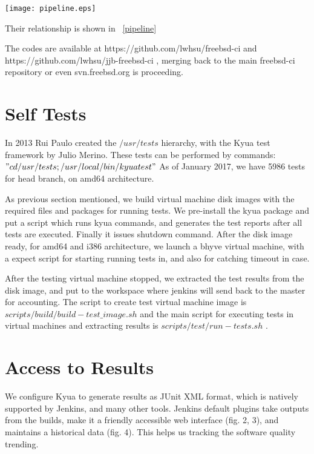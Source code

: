 \documentclass[a4paper,twocolumn,10pt]{article}
\begin{document}
\begin{figure*}
\texttt{[image: pipeline.eps]}
\caption{head-amd64 pipeline}
\label{pipeline}
\end{figure*}

Their relationship is shown in ~\ref{pipeline}

The codes are available at https://github.com/lwhsu/freebsd-ci and
https://github.com/lwhsu/jjb-freebsd-ci , merging back to the main freebsd-ci
repository or even svn.freebsd.org is proceeding.

\section{Self Tests}

In 2013 Rui Paulo created the $/usr/tests$ hierarchy, with the Kyua test
framework by Julio Merino. These tests can be performed by commands: $"cd
/usr/tests; /usr/local/bin/kyua test"$ As of January 2017, we have 5986 tests
for head branch, on amd64 architecture.

As previous section mentioned, we build virtual machine disk images with the
required files and packages for running tests. We pre-install the kyua package
and put a script which runs kyua commands, and generates the test reports after
all tests are executed. Finally it issues shutdown command. After the disk
image ready, for amd64 and i386 architecture, we launch a bhyve virtual
machine, with a expect script for starting running tests in, and also for
catching timeout in case.

After the testing virtual machine stopped, we extracted the test results from
the disk image, and put to the workspace where jenkins will send back to the
master for accounting. The script to create test virtual machine image is
$scripts/build/build-test\_image.sh$ and the main script for executing tests in
virtual machines and extracting results is $scripts/test/run-tests.sh$ .

\section{Access to Results}

We configure Kyua to generate results as JUnit XML format, which is natively
supported by Jenkins, and many other tools. Jenkins default plugins take
outputs from the builds, make it a friendly accessible web interface (fig. 2,
3), and maintains a historical data (fig. 4). This helps us tracking the
software quality trending.
\end{document}
